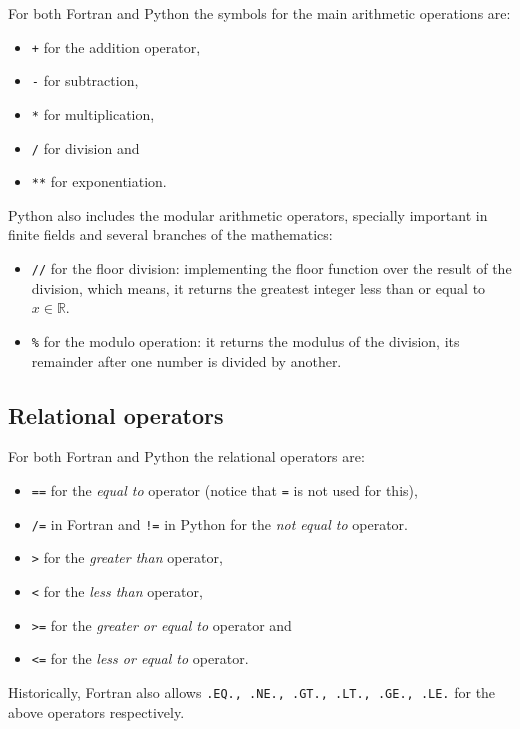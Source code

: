         For both Fortran and Python the symbols for the main arithmetic operations are:
        \vspace{-0.5cm}
        \begin{itemize}[noitemsep]
            \item \texttt{+} for the addition operator, 
            \item \texttt{-} for subtraction,
            \item \texttt{*} for multiplication,
            \item \texttt{/} for division and
            \item \texttt{**} for exponentiation.
        \end{itemize}
        Python also includes the modular arithmetic operators, specially important in finite fields and several branches of the mathematics:
        \vspace{-0.5cm}
        \begin{itemize}[noitemsep]
            \item \texttt{//} for the floor division: implementing the floor function over the result of the division, which means, it returns the greatest integer less than or equal to $x\in\mathbb{R}$.
            \item \texttt{\%} for the modulo operation: it returns the modulus of the division, its remainder after one number is divided by another.
        \end{itemize}
        
        
        
        \subsection*{Relational operators}
        
        For both Fortran and Python the relational operators are:
        \vspace{-0.5cm}
        \begin{itemize}[noitemsep]
            \item \texttt{==} for the \textit{equal to} operator (notice that \texttt{=} is not used for this), 
            \item \texttt{/=} in Fortran and \texttt{!=} in Python for the \textit{not equal to} operator.
            \item \texttt{>} for the \textit{greater than} operator,
            \item \texttt{<} for the \textit{less than} operator,
            \item \texttt{>=} for the \textit{greater or equal to} operator and
            \item \texttt{<=} for the \textit{less or equal to} operator.
        \end{itemize}
        Historically, Fortran also allows \texttt{.EQ., .NE., .GT., .LT., .GE., .LE.} for the above operators respectively. 
    
